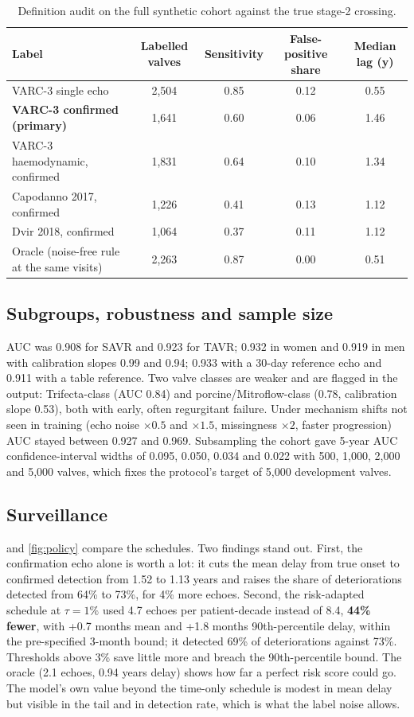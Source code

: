 \documentclass[11pt,a4paper]{article}
\begin{document}
\begin{table}[t]
\centering\small
\caption{Definition audit on the full synthetic cohort against the true stage-2 crossing.}
\label{tab:audit}
\footnotesize
\begin{tabular}{@{}lcccc@{}}
\toprule
Label & Labelled valves & Sensitivity & False-positive share & Median lag (y) \\
\midrule
VARC-3 single echo & 2,504 & 0.85 & 0.12 & 0.55 \\
\textbf{VARC-3 confirmed (primary)} & 1,641 & 0.60 & 0.06 & 1.46 \\
VARC-3 haemodynamic, confirmed & 1,831 & 0.64 & 0.10 & 1.34 \\
Capodanno 2017, confirmed & 1,226 & 0.41 & 0.13 & 1.12 \\
Dvir 2018, confirmed & 1,064 & 0.37 & 0.11 & 1.12 \\
Oracle (noise-free rule at the same visits) & 2,263 & 0.87 & 0.00 & 0.51 \\
\bottomrule
\end{tabular}
\end{table}

\subsection{Subgroups, robustness and sample size}
AUC was 0.908 for SAVR and 0.923 for TAVR; 0.932 in women and 0.919 in men with calibration slopes 0.99 and 0.94; 0.933 with a 30-day reference echo and 0.911 with a table reference. Two valve classes are weaker and are flagged in the output: Trifecta-class (AUC 0.84) and porcine/Mitroflow-class (0.78, calibration slope 0.53), both with early, often regurgitant failure. Under mechanism shifts not seen in training (echo noise $\times 0.5$ and $\times 1.5$, missingness $\times 2$, faster progression) AUC stayed between 0.927 and 0.969. Subsampling the cohort gave 5-year AUC confidence-interval widths of 0.095, 0.050, 0.034 and 0.022 with 500, 1,000, 2,000 and 5,000 valves, which fixes the protocol's target of 5,000 development valves.

\subsection{Surveillance}
 and \cref{fig:policy} compare the schedules. Two findings stand out. First, the confirmation echo alone is worth a lot: it cuts the mean delay from true onset to confirmed detection from 1.52 to 1.13 years and raises the share of deteriorations detected from 64\% to 73\%, for 4\% more echoes. Second, the risk-adapted schedule at $\tau = 1\%$ used 4.7 echoes per patient-decade instead of 8.4, \textbf{44\% fewer}, with +0.7 months mean and +1.8 months 90th-percentile delay, within the pre-specified 3-month bound; it detected 69\% of deteriorations against 73\%. Thresholds above 3\% save little more and breach the 90th-percentile bound. The oracle (2.1 echoes, 0.94 years delay) shows how far a perfect risk score could go. The model's own value beyond the time-only schedule is modest in mean delay but visible in the tail and in detection rate, which is what the label noise allows.
\end{document}
